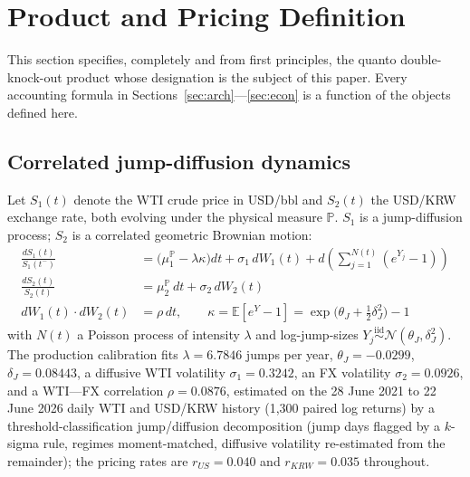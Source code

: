 \documentclass[11pt,a4paper]{article}
\begin{document}
\section{Product and Pricing Definition}
\label{sec:product}

This section specifies, completely and from first principles, the quanto double-knock-out product whose designation is the subject of this paper. Every accounting formula in Sections~\ref{sec:arch}---\ref{sec:econ} is a function of the objects defined here.

\subsection{Correlated jump-diffusion dynamics}
\label{sec:sde}

Let $S_1(t)$ denote the WTI crude price in USD/bbl and $S_2(t)$ the USD/KRW exchange rate, both evolving under the physical measure $\mathbb P$. $S_1$ is a jump-diffusion process; $S_2$ is a correlated geometric Brownian motion:
\begin{align}
\frac{dS_1(t)}{S_1(t^-)} &= \big(\mu_1^{\mathbb P}-\lambda\kappa\big)dt + \sigma_1\,dW_1(t) + d\!\left(\sum_{j=1}^{N(t)}(e^{Y_j}-1)\right) \\
\frac{dS_2(t)}{S_2(t)} &= \mu_2^{\mathbb P}\,dt + \sigma_2\,dW_2(t) \\
dW_1(t)\cdot dW_2(t) &= \rho\,dt, \qquad \kappa = \mathbb E[e^Y-1] = \exp\!\big(\theta_J+\tfrac12\delta_J^2\big)-1
\end{align}
with $N(t)$ a Poisson process of intensity $\lambda$ and log-jump-sizes $Y_j \overset{\text{iid}}{\sim}\mathcal N(\theta_J,\delta_J^2)$. The production calibration fits $\lambda=6.7846$ jumps per year, $\theta_J=-0.0299$, $\delta_J=0.08443$, a diffusive WTI volatility $\sigma_1=0.3242$, an FX volatility $\sigma_2=0.0926$, and a WTI---FX correlation $\rho=0.0876$, estimated on the 28 June 2021 to 22 June 2026 daily WTI and USD/KRW history (1{,}300 paired log returns) by a threshold-classification jump/diffusion decomposition (jump days flagged by a $k$-sigma rule, regimes moment-matched, diffusive volatility re-estimated from the remainder); the pricing rates are $r_{US}=0.040$ and $r_{KRW}=0.035$ throughout.
\end{document}
